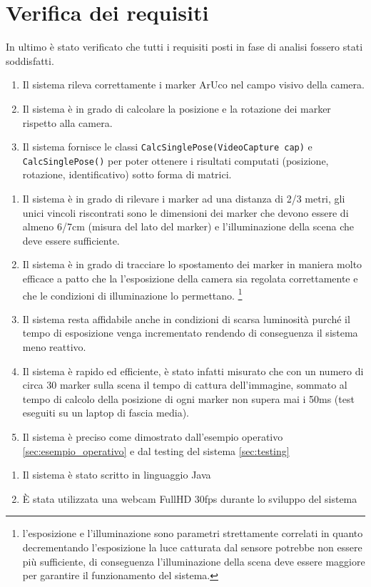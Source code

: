 \documentclass[12pt,a4paper,openright,twoside]{book}
\begin{document}
\section{Verifica dei requisiti} \label{sec:verifica_dei_requisiti}
In ultimo è stato verificato che tutti i requisiti posti in fase di analisi fossero stati soddisfatti.
\begin{enumerate}[label=RF\arabic*]
	\item Il sistema rileva correttamente i marker ArUco nel campo visivo della camera.
	\item Il sistema è in grado di calcolare la posizione e la rotazione dei marker rispetto alla camera.
	\item Il sistema fornisce le classi \texttt{CalcSinglePose(VideoCapture cap)} e \texttt{CalcSinglePose()} per poter ottenere i risultati computati (posizione, rotazione, identificativo) sotto forma di matrici.
\end{enumerate} 
\begin{enumerate}[label=RNF\arabic*]
	\item Il sistema è in grado di rilevare i marker ad una distanza di 2/3 metri, gli unici vincoli riscontrati sono le dimensioni dei marker che devono essere di almeno 6/7cm (misura del lato del marker) e l'illuminazione della scena che deve essere sufficiente.
	\item Il sistema è in grado di tracciare lo spostamento dei marker in maniera molto efficace a patto che la l'esposizione della camera sia regolata correttamente e che le condizioni di illuminazione lo permettano. \footnote{l'esposizione e l'illuminazione sono parametri strettamente correlati in quanto decrementando l'esposizione la luce catturata dal sensore potrebbe non essere più sufficiente, di conseguenza l'illuminazione della scena deve essere maggiore per garantire il funzionamento del sistema.}
	\item Il sistema resta affidabile anche in condizioni di scarsa luminosità purché il tempo di esposizione venga incrementato rendendo di conseguenza il sistema meno reattivo.
	\item Il sistema è rapido ed efficiente, è stato infatti misurato che con un numero di circa 30 marker sulla scena il tempo di cattura dell'immagine, sommato al tempo di calcolo della posizione di ogni marker non supera mai i 50ms (test eseguiti su un laptop di fascia media).
	\item Il sistema è preciso come dimostrato dall'esempio operativo \ref{sec:esempio_operativo} e dal testing del sistema \ref{sec:testing}
\end{enumerate} 
\begin{enumerate}[label=RT\arabic*]
	\item Il sistema è stato scritto in linguaggio Java
	\item È stata utilizzata una webcam FullHD 30fps durante lo sviluppo del sistema
\end{enumerate} 
\end{document}
